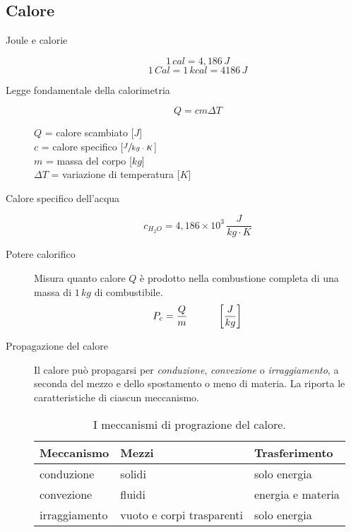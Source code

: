 \documentclass[a4paper,11pt,italian]{article}
\begin{document}
\subsection{Calore}

\begin{description}
  \item[Joule e calorie] 
  \[ 1 \, cal = 4,186 \, J \] \[ 1 \, Cal = 1 \, kcal = 4186 \, J \]
  
  \item[Legge fondamentale della calorimetria]
  \[ Q = cm \Delta T \]
  \begin{multicols}{2}
  $ Q $ = calore scambiato [$ J $]\\
  $ c $ = calore specifico [$ \sfrac{J}{kg\cdot K} $]\\
  $ m $ = massa del corpo [$ kg $]\\
  $ \Delta T $ = variazione di temperatura [$ K $]
  \end{multicols}
  
  \item[Calore specifico dell'acqua] 
  \[ c_{H_2O} = 4,186 \times 10^3 \, \frac{J}{kg \cdot K}\]
  
  \item[Potere calorifico] 
  Misura quanto calore $ Q $ è prodotto nella combustione completa di una massa di $ 1 \, kg $ di combustibile.
  \[ P_c = \frac{Q}{m} \hspace*{3em} \left[ \frac{J}{kg} \right] \]
  
  \item[Propagazione del calore] 
  Il calore può propagarsi per \emph{conduzione}, \emph{convezione} o \emph{irraggiamento}, a seconda del mezzo e dello spostamento o meno di materia. La  riporta le caratteristiche di ciascun meccanismo.

\begin{table}[htb]\centering\footnotesize
\begin{tabular}{lll}\toprule
\textbf{Meccanismo} & \textbf{Mezzi}            & \textbf{Trasferimento}\\\midrule
conduzione          & solidi                    & solo energia\\\addlinespace[1em]
convezione          & fluidi                    & energia e materia\\\addlinespace[1em]
irraggiamento       & vuoto e corpi trasparenti & solo energia\\\bottomrule
\end{tabular}
\caption{I meccanismi di prograzione del calore.}
\label{tab:conduzione}
\end{table}



\end{description}
\end{document}
